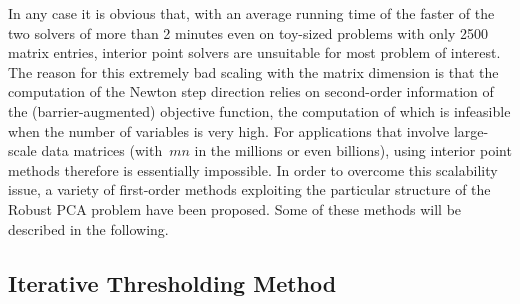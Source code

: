 \documentclass{../../common/projectreport}
\begin{document}
In any case it is obvious that, with an average running time of the faster of the two solvers of more than 2 minutes even on toy-sized problems with only 2500 matrix entries, interior point solvers are unsuitable for most problem of interest. The reason for this extremely bad scaling with the matrix dimension is that the computation of the Newton step direction relies on second-order information of the (barrier-augmented) objective function, the computation of which is infeasible when the number of variables is very high. For applications that involve large-scale data matrices (with~$mn$ in the millions or even billions), using interior point methods therefore is essentially impossible. In order to overcome this scalability issue, a variety of first-order methods exploiting the particular structure of the Robust PCA problem have been proposed. Some of these methods will be described in the following.

%
%


\subsection{Iterative Thresholding Method}
\label{Algorithms:MainAlgs:ITM:Subsec}
\end{document}
